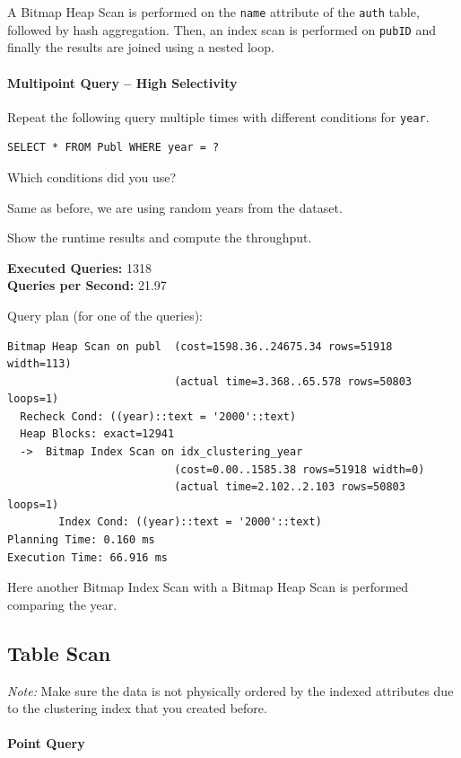 \documentclass[11pt]{scrartcl}
\begin{document}
A Bitmap Heap Scan is performed on the \texttt{name} attribute of the \texttt{auth} table, followed by hash aggregation.
Then, an index scan is performed on \texttt{pubID} and finally the results are joined using a nested loop.

\paragraph{Multipoint Query -- High Selectivity}

Repeat the following query multiple times with different conditions for \texttt{year}.

\begin{lstlisting}[style=dbtsql]
SELECT * FROM Publ WHERE year = ?
\end{lstlisting}

Which conditions did you use?

Same as before, we are using random years from the dataset.

Show the runtime results and compute the throughput.

\textbf{Executed Queries: } 1318\\
\textbf{Queries per Second: } 21.97

Query plan (for one of the queries):

{\small
\parskip0pt\begin{verbatim}
Bitmap Heap Scan on publ  (cost=1598.36..24675.34 rows=51918 width=113)
                          (actual time=3.368..65.578 rows=50803 loops=1)
  Recheck Cond: ((year)::text = '2000'::text)
  Heap Blocks: exact=12941
  ->  Bitmap Index Scan on idx_clustering_year
                          (cost=0.00..1585.38 rows=51918 width=0)
                          (actual time=2.102..2.103 rows=50803 loops=1)
        Index Cond: ((year)::text = '2000'::text)
Planning Time: 0.160 ms
Execution Time: 66.916 ms
\end{verbatim}}

Here another Bitmap Index Scan with a Bitmap Heap Scan is performed comparing the year.

\subsection*{Table Scan}

\emph{Note:} Make sure the data is not physically ordered by the indexed attributes due to the clustering index that you created before.

\paragraph{Point Query}
\end{document}

